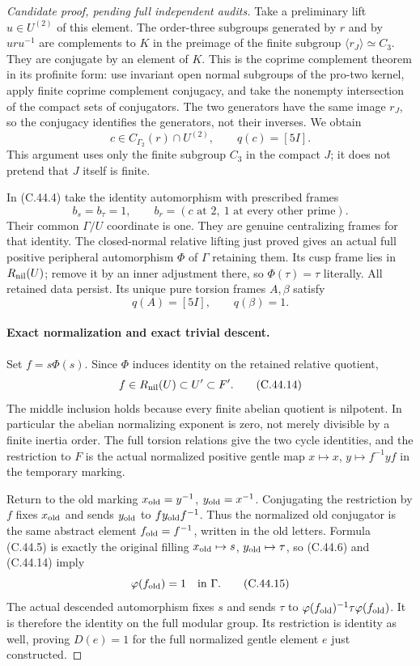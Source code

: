 \begin{proof}[Candidate proof, pending full independent audits]
Take a preliminary lift $u\in U^{(2)}$ of this element.
The order-three subgroups generated by $r$ and by $uru^{-1}$
are complements to $K$ in the preimage of the finite subgroup
$\langle r_J\rangle\simeq C_3$. They are conjugate by an
element of $K$. This is the coprime complement theorem in its
profinite form: use invariant open normal subgroups of the
pro-two kernel, apply finite coprime complement conjugacy, and
take the nonempty intersection of the compact sets of conjugators.
The two generators have the same image $r_J$, so the conjugacy
identifies the generators, not their inverses. We obtain
\[
 c\in C_{\Gamma_2}(r)\cap U^{(2)},\qquad q(c)=[5I].    \tag{C.44.11}
\]
This argument uses only the finite subgroup $C_3$ in the compact
$J$; it does not pretend that $J$ itself is finite.

In (C.44.4) take the identity automorphism with prescribed frames
\[
 b_s=b_\tau=1,\qquad
 b_r=(c\text{ at }2,\ 1\text{ at every other prime}).  \tag{C.44.12}
\]
Their common $\Gamma/U$ coordinate is one. They are genuine
centralizing frames for that identity. The closed-normal relative
lifting just proved gives an actual full positive peripheral
automorphism $\Phi$ of $\Gamma$ retaining them. Its cusp frame
lies in $R_{\rm nil}(U)$; remove it by an inner adjustment there,
so $\Phi(\tau)=\tau$ literally. All retained data persist.
Its unique pure torsion frames $A,\beta$ satisfy
\[
                     q(A)=[5I],\qquad q(\beta)=1.       \tag{C.44.13}
\]

\paragraph{Exact normalization and exact trivial descent.}
Set $f=s\Phi(s)$. Since $\Phi$ induces identity on the retained
relative quotient,
\[
        f\in R_{\rm nil}(U)\subset U'\subset F'.        \tag{C.44.14}
\]
The middle inclusion holds because every finite abelian quotient
is nilpotent. In particular the abelian normalizing exponent is
zero, not merely divisible by a finite inertia order. The full
torsion relations give the two cycle identities, and the
restriction to $F$ is the actual normalized positive gentle map
$x\mapsto x$, $y\mapsto f^{-1}yf$ in the temporary marking.

Return to the old marking
$x_{\rm old}=y^{-1}$, $y_{\rm old}=x^{-1}$.
Conjugating the restriction by $f$ fixes $x_{\rm old}$ and sends
$y_{\rm old}$ to $f y_{\rm old}f^{-1}$. Thus the normalized old
conjugator is the same abstract element $f_{\rm old}=f^{-1}$,
written in the old letters. Formula (C.44.5) is exactly the
original filling $x_{\rm old}\mapsto s$,
$y_{\rm old}\mapsto\tau$, so (C.44.6) and (C.44.14) imply
\[
                           \varphi(f_{\rm old})=1
                            \quad\hbox{in }\Gamma.     \tag{C.44.15}
\]
The actual descended automorphism fixes $s$ and sends $\tau$
to $\varphi(f_{\rm old})^{-1}\tau\varphi(f_{\rm old})$.
It is therefore the identity on the full modular group.
Its restriction is identity as well, proving $D(e)=1$ for the
full normalized gentle element $e$ just constructed.


\end{proof}
